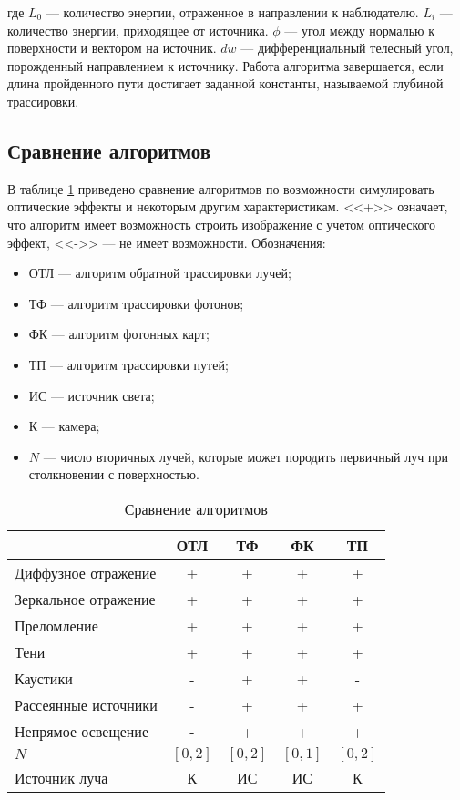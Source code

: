 где $L_0$ --- количество энергии, отраженное в направлении к наблюдателю. $L_i$ --- количество энергии, приходящее от источника. $\phi$ --- угол между нормалью к поверхности и вектором на источник. $dw$ --- дифференциальный телесный угол, порожденный направлением к источнику. Работа алгоритма завершается, если длина пройденного пути достигает заданной константы, называемой глубиной трассировки. 




\clearpage

\subsection{Сравнение алгоритмов}

В таблице \ref{tbl:comp} приведено сравнение алгоритмов по возможности симулировать оптические эффекты и некоторым другим характеристикам. <<+>> означает, что алгоритм имеет возможность строить изображение с учетом оптического эффект, <<->> --- не имеет возможности. Обозначения:

\begin{itemize}
	\item ОТЛ --- алгоритм обратной трассировки лучей;
	\item ТФ --- алгоритм трассировки фотонов;
	\item ФК --- алгоритм фотонных карт;
	\item ТП --- алгоритм трассировки путей;
	\item ИС --- источник света;
	\item К --- камера;
	\item $N$ --- число вторичных лучей, которые может породить первичный луч при столкновении с поверхностью.
\end{itemize}

\begin{table}[htbp]
	\centering
	\caption{Сравнение алгоритмов}
	\label{tbl:comp}
	\begin{tabular}{|l|c|c|c|c|}
	\hline
	& ОТЛ & ТФ & ФК & ТП \\
	\hline
	Диффузное отражение & + & + & + & + \\
	\hline
	Зеркальное отражение & + & + & + & + \\
	\hline
	Преломление & + & + & + & + \\
	\hline
	Тени & + & + & + & + \\
	\hline
	Каустики & - & + & + & - \\
	\hline
	Рассеянные источники & - & + & + & + \\
	\hline
	Непрямое освещение & - & + & + & + \\
	\hline
	$N$  & $[0,2]$ & $[0,2]$ & $[0,1]$ & $[0,2]$ \\
	\hline
	Источник луча & К & ИС & ИС & К \\
	\hline
	\end{tabular}
\end{table}


